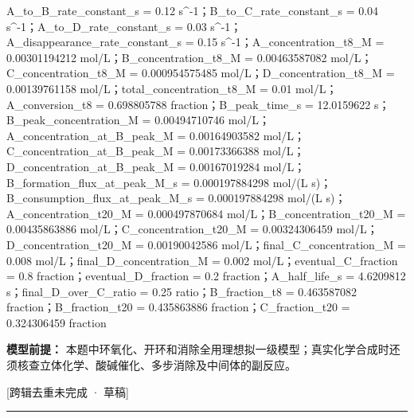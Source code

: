 \documentclass[UTF8,11pt,a4paper]{ctexart}
\begin{document}
A\_to\_B\_rate\_constant\_s = 0.12 s\textasciicircum{}-1；B\_to\_C\_rate\_constant\_s = 0.04 s\textasciicircum{}-1；A\_to\_D\_rate\_constant\_s = 0.03 s\textasciicircum{}-1；A\_disappearance\_rate\_constant\_s = 0.15 s\textasciicircum{}-1；A\_concentration\_t8\_M = 0.00301194212 mol/L；B\_concentration\_t8\_M = 0.00463587082 mol/L；C\_concentration\_t8\_M = 0.000954575485 mol/L；D\_concentration\_t8\_M = 0.00139761158 mol/L；total\_concentration\_t8\_M = 0.01 mol/L；A\_conversion\_t8 = 0.698805788 fraction；B\_peak\_time\_s = 12.0159622 s；B\_peak\_concentration\_M = 0.00494710746 mol/L；A\_concentration\_at\_B\_peak\_M = 0.00164903582 mol/L；C\_concentration\_at\_B\_peak\_M = 0.00173366388 mol/L；D\_concentration\_at\_B\_peak\_M = 0.00167019284 mol/L；B\_formation\_flux\_at\_peak\_M\_s = 0.000197884298 mol/(L s)；B\_consumption\_flux\_at\_peak\_M\_s = 0.000197884298 mol/(L s)；A\_concentration\_t20\_M = 0.000497870684 mol/L；B\_concentration\_t20\_M = 0.00435863886 mol/L；C\_concentration\_t20\_M = 0.00324306459 mol/L；D\_concentration\_t20\_M = 0.00190042586 mol/L；final\_C\_concentration\_M = 0.008 mol/L；final\_D\_concentration\_M = 0.002 mol/L；eventual\_C\_fraction = 0.8 fraction；eventual\_D\_fraction = 0.2 fraction；A\_half\_life\_s = 4.6209812 s；final\_D\_over\_C\_ratio = 0.25 ratio；B\_fraction\_t8 = 0.463587082 fraction；B\_fraction\_t20 = 0.435863886 fraction；C\_fraction\_t20 = 0.324306459 fraction\par
\noindent\textbf{模型前提：}
本题中环氧化、开环和消除全用理想拟一级模型；真实化学合成时还须核查立体化学、酸碱催化、多步消除及中间体的副反应。\par
\noindent\textcolor{red!65!black}{[跨辑去重未完成 · 草稿]} \par
\medskip\hrule\medskip
{}
\end{document}
